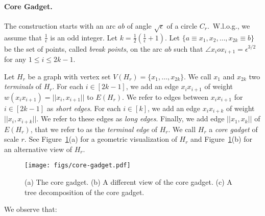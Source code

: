 \paragraph{Core Gadget.~}  The construction starts with an arc $ab$ of angle $\sqrt{\epsilon}$ of a circle $C_r$.~W.l.o.g., we assume that $\frac{1}{\epsilon}$ is an odd integer.  Let $k = \frac{1}{2}(\frac{1}{\epsilon}+1)$.  Let $\{a \equiv x_1, x_2, \ldots, x_{2k} \equiv b\}$ be the set of points, called \emph{break points}, on the arc $ab$ such that $\angle x_iox_{i+1} = \epsilon^{3/2}$ for any $1\leq i \leq 2k-1$.

Let $H_r$ be a graph with vertex set $V(H_r) = \{x_1,\ldots, x_{2k}\}$. We call $x_1$ and $x_{2k}$ two \emph{terminals} of $H_r$. For each $i \in [2k-1]$, we add an edge $x_ix_{i+1}$ of weight $w(x_ix_{i+1}) = ||x_i,x_{i+1}||$ to $E(H_r)$. We refer to edges between $x_ix_{i+1}$ for $i \in [2k-1]$ as \emph{short edges}.  For each $i \in [k]$, we add an edge $x_ix_{i+k}$ of weight $||x_{i},x_{i+k}||$.  We refer to these edges as \emph{long edges}. Finally, we add edge $||x_1,x_k||$ of $E(H_r)$, that we refer to as the \emph{terminal edge} of $H_r$.   We call $H_r$ a \emph{core gadget} of scale $r$.  See Figure~\ref{fig:core}(a) for a geometric visualization of $H_r$ and Figure~\ref{fig:core}(b) for an alternative view of $H_r$.

\begin{figure}
	\centering
	\vspace{-20pt}
	\texttt{[image: figs/core-gadget.pdf]}
	\caption{\footnotesize{(a) The core gadget. (b) A different view of the core gadget. (c) A tree decomposition of the core gadget. }}
	\label{fig:core}
\end{figure}

\noindent We observe that:

